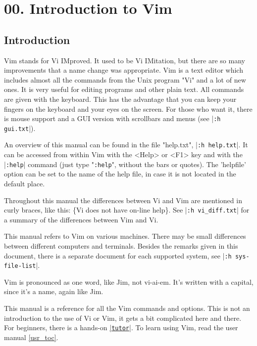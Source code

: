 \section{00. Introduction to Vim}
\label{ref}
\label{reference}
\subsection{Introduction}
\label{intro}
Vim stands for Vi IMproved.
It used to be Vi IMitation, but there are so many improvements that a name change was appropriate.
Vim is a text editor which includes almost all the commands from the Unix program "Vi" and a lot of new ones.
It is very useful for editing programs and other plain text.
All commands are given with the keyboard.
This has the advantage that you can keep your fingers on the keyboard and your eyes on the screen.
For those who want it, there is mouse support and a GUI version with scrollbars and menus (see |\verb!:h gui.txt!|).

An overview of this manual can be found in the file "help.txt", |\verb!:h help.txt!|.
It can be accessed from within Vim with the <Help> or <F1> key and with the |\verb!:help!| command (just type "\verb!:help!", without the bars or quotes).
The 'helpfile' option can be set to the name of the help file, in case it is not located in the default place.

Throughout this manual the differences between Vi and Vim are mentioned in curly braces, like this: \{Vi does not have on-line help\}.
See |\verb!:h vi_diff.txt!| for a summary of the differences between Vim and Vi.

This manual refers to Vim on various machines.
There may be small differences between different computers and terminals.
Besides the remarks given in this document, there is a separate document for each supported system, see |\verb!:h sys-file-list!|.

\label{pronounce}
Vim is pronounced as one word, like Jim, not vi-ai-em.
It's written with a capital, since it's a name, again like Jim.

This manual is a reference for all the Vim commands and options.
This is not an introduction to the use of Vi or Vim, it gets a bit complicated here and there.
For beginners, there is a hands-on \hyperref[tutor]{|\texttt{tutor}|}.
To learn using Vim, read the user manual \ref{usr_toc}.

